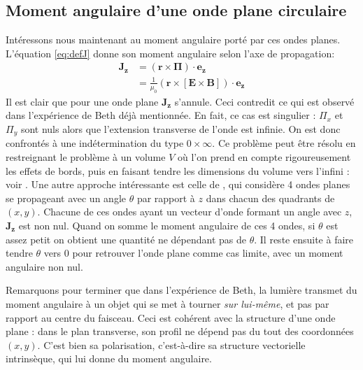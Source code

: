 \subsection{Moment angulaire d'une onde plane circulaire}
\label{sec:ma_circ}
Intéressons nous maintenant au moment angulaire porté par ces ondes planes. L'équation \ref{eq:defJ} donne son moment angulaire selon l'axe de propagation: 
\begin{align*}
\bm{J_z}&=(\bm{r}\times\bm{\Pi})\cdot\bm{e_z}\\
&=\frac{1}{\mu_0}(\bm{r}\times[\bm{E}\times\bm{B}])\cdot\bm{e_z}
\end{align*}
Il est clair que pour une onde plane $\bm{J_z}$ s'annule. Ceci contredit ce qui est observé dans l'expérience de Beth  déjà mentionnée. En fait, ce cas est singulier : $\Pi_x$ et $\Pi_y $ sont nuls alors que l'extension transverse de l'onde est infinie. On est donc confrontés à une indétermination du type $0\times \infty$. 
Ce problème peut être résolu en restreignant le problème à un volume $V$ où l'on prend en compte rigoureusement les effets de bords, puis en faisant tendre les dimensions du volume vers l'infini : voir . Une autre approche intéressante est celle de , qui considère 4 ondes planes se propageant avec un angle $\theta$ par rapport à $z$ dans chacun des quadrants de $(x,y)$. Chacune de ces ondes ayant un vecteur d'onde formant un angle avec $z$, $\bm{J_z}$ est non nul. Quand on somme le moment angulaire de ces 4 ondes, si $\theta$ est assez petit on obtient une quantité ne dépendant pas de $\theta$. Il reste ensuite à faire tendre $\theta$ vers 0 pour retrouver l'onde plane comme cas limite, avec un moment angulaire non nul.

Remarquons pour terminer que dans l'expérience de Beth, la lumière transmet du moment angulaire à un objet qui se met à tourner \textit{sur lui-même}, et pas par rapport au centre du faisceau. Ceci est cohérent avec la structure d'une onde plane : dans le plan transverse, son profil ne dépend pas du tout des coordonnées $(x,y)$. C'est bien sa polarisation, c'est-à-dire sa structure vectorielle intrinsèque, qui lui donne du moment angulaire. 

